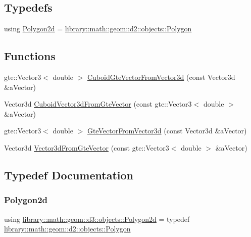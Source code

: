 \subsection*{Typedefs}
\begin{DoxyCompactItemize}
\item 
using \hyperlink{namespacelibrary_1_1math_1_1geom_1_1d3_1_1objects_ae339035ccf9a6f4f0d2945fdcfd76f95}{Polygon2d} = \hyperlink{classlibrary_1_1math_1_1geom_1_1d2_1_1objects_1_1_polygon}{library\+::math\+::geom\+::d2\+::objects\+::\+Polygon}
\end{DoxyCompactItemize}
\subsection*{Functions}
\begin{DoxyCompactItemize}
\item 
gte\+::\+Vector3$<$ double $>$ \hyperlink{namespacelibrary_1_1math_1_1geom_1_1d3_1_1objects_a0afd2257f7c64d3588b9fd1f239e8c61}{Cuboid\+Gte\+Vector\+From\+Vector3d} (const Vector3d \&a\+Vector)
\item 
Vector3d \hyperlink{namespacelibrary_1_1math_1_1geom_1_1d3_1_1objects_a3fa3b44e46ea7d2e14d722ee1138d2f6}{Cuboid\+Vector3d\+From\+Gte\+Vector} (const gte\+::\+Vector3$<$ double $>$ \&a\+Vector)
\item 
gte\+::\+Vector3$<$ double $>$ \hyperlink{namespacelibrary_1_1math_1_1geom_1_1d3_1_1objects_ab253aeb9c4d372b3379e95e15711a98f}{Gte\+Vector\+From\+Vector3d} (const Vector3d \&a\+Vector)
\item 
Vector3d \hyperlink{namespacelibrary_1_1math_1_1geom_1_1d3_1_1objects_a17fdd18d6c2bcacf17c9c1716f99609c}{Vector3d\+From\+Gte\+Vector} (const gte\+::\+Vector3$<$ double $>$ \&a\+Vector)
\end{DoxyCompactItemize}


\subsection{Typedef Documentation}
\mbox{\label{namespacelibrary_1_1math_1_1geom_1_1d3_1_1objects_ae339035ccf9a6f4f0d2945fdcfd76f95}} 
\subsubsection{\texorpdfstring{Polygon2d}{Polygon2d}}
{\footnotesize\ttfamily using \hyperlink{namespacelibrary_1_1math_1_1geom_1_1d3_1_1objects_ae339035ccf9a6f4f0d2945fdcfd76f95}{library\+::math\+::geom\+::d3\+::objects\+::\+Polygon2d} = typedef \hyperlink{classlibrary_1_1math_1_1geom_1_1d2_1_1objects_1_1_polygon}{library\+::math\+::geom\+::d2\+::objects\+::\+Polygon}}



